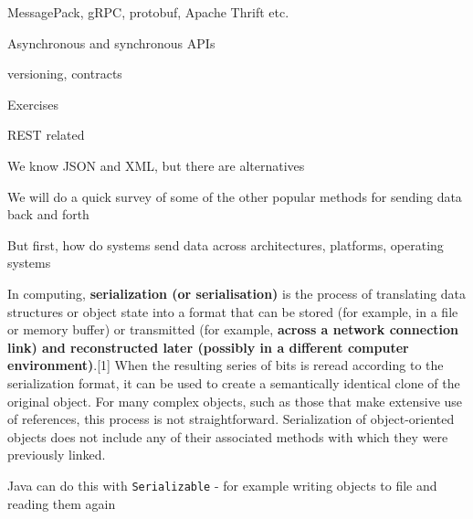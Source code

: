 \documentclass[Screen16to9,17pt]{foils}
\begin{document}

\begin{list2}
\item MessagePack, gRPC, protobuf, Apache Thrift etc.
\item Asynchronous and synchronous APIs
\item versioning, contracts
\end{list2}

Exercises
\begin{list2}
\item REST related
\item
\end{list2}




\begin{list2}
\item We know JSON and XML, but there are alternatives
\item We will do a quick survey of some of the other popular methods for sending data back and forth
\item But first, how do systems send data across architectures, platforms, operating systems
\end{list2}


\begin{quote}

\end{quote}
In computing, {\bf serialization (or serialisation)} is the process of translating data structures or object state into a format that can be stored (for example, in a file or memory buffer) or transmitted (for example, {\bf across a network connection link) and reconstructed later (possibly in a different computer environment)}.[1] When the resulting series of bits is reread according to the serialization format, it can be used to create a semantically identical clone of the original object. For many complex objects, such as those that make extensive use of references, this process is not straightforward. Serialization of object-oriented objects does not include any of their associated methods with which they were previously linked.
\begin{list2}
\item Java can do this with \verb+Serializable+ - for example writing objects to file and reading them again
\end{list2}
\end{document}
